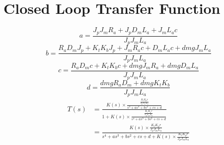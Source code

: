 \documentclass[a4paper, 11pt, compsoc]{IEEEtran}
\begin{document}
		\section{Closed Loop Transfer Function}\label{app:cltf}
			\begin{equation}
				a = \frac{ J_pJ_mR_a + J_pD_mL_a + J_mL_ac }{J_pJ_mL_a}
			\end{equation}
			\begin{equation}
				b = \frac{R_aD_mJ_p + K_tK_bJ_p + J_mR_ac + D_mL_ac + dmgJ_mL_a}{J_pJ_mL_a}
			\end{equation}
			\begin{equation}
				c =\frac{R_aD_mc + K_tK_bc + dmgJ_mR_a + dmgD_mL_a}{J_pJ_mL_a}
			\end{equation}
			\begin{equation}
				d = \frac{dmgR_aD_m + dmgK_tK_b}{J_pJ_mL_a}
			\end{equation}
			\begin{equation}
				\begin{split}
					T(s) & = \frac{K(s) \times \frac{ \frac{K_tK_pr}{J_pJ_mL_a} }{ s^4 + as^3 +bs^2 + cs + d }}{1 + K(s) \times \frac{ \frac{K_tK_pr}{J_pJ_mL_a} }{ s^4 + as^3 +bs^2 + cs + d }}\\
						 & = \frac{K(s) \times \frac{K_tK_pr}{J_pJ_mL_a}}{ s^4 + as^3 +bs^2 + cs + d + K(s) \times \frac{K_tK_pr}{J_pJ_mL_a}}
				\end{split}
			\end{equation}
\end{document}
